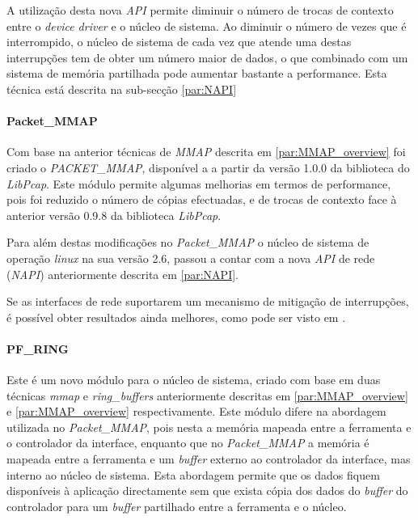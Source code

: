 A utilização desta nova \textit{API} permite diminuir o número de trocas de contexto entre o \textit{device driver} e o núcleo de sistema.
Ao diminuir o número de vezes que é interrompido, o núcleo de sistema de cada vez que atende uma destas interrupções tem de obter um número maior de dados, o que combinado com um sistema de memória partilhada pode aumentar bastante a performance.
Esta técnica está descrita na sub-secção \ref{par:NAPI}

\paragraph*{Packet\_MMAP}

Com base na anterior técnicas de \textit{MMAP} descrita em \ref{par:MMAP_overview} foi criado o \textit{PACKET\_MMAP}, disponível a a partir da versão 1.0.0 da biblioteca do \textit{LibPcap}.
Este módulo permite algumas melhorias em termos de performance, pois foi reduzido o número de cópias efectuadas, e de trocas de contexto face à anterior versão 0.9.8 da biblioteca \textit{LibPcap}.

Para além destas modificações no \textit{Packet\_MMAP} o núcleo de sistema de operação \textit{linux} na sua versão 2.6, passou a contar com a nova \textit{API} de rede (\textit{NAPI}) anteriormente descrita em \ref{par:NAPI}.

Se as interfaces de rede suportarem um mecanismo de mitigação de interrupções, é possível obter resultados ainda melhores, como pode ser visto em \cite{Deri2004}.

% 

\paragraph*{PF\_RING}

Este é um novo módulo para o núcleo de sistema, criado com base em duas técnicas \textit{mmap} e \textit{ring\_buffers} anteriormente descritas em \ref{par:MMAP_overview} e \ref{par:MMAP_overview} respectivamente.
Este módulo difere na abordagem utilizada no \textit{Packet\_MMAP}, pois nesta a memória mapeada entre a ferramenta e o controlador da interface, enquanto que no \textit{Packet\_MMAP} a memória é mapeada entre a ferramenta e um \textit{buffer} externo ao controlador da interface, mas interno ao núcleo de sistema.
Esta abordagem permite que os dados fiquem disponíveis à aplicação directamente sem que exista cópia dos dados do \textit{buffer} do controlador para um \textit{buffer} partilhado entre a ferramenta e o núcleo\cite{:PF_RING}.
 
